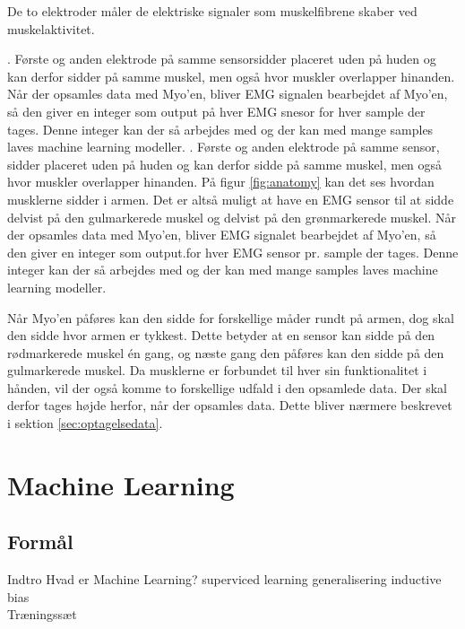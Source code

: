 De to elektroder måler de elektriske signaler som muskelfibrene skaber ved muskelaktivitet.

\cite{nerveledning}. Første og anden elektrode på samme sensorsidder placeret uden på huden og kan derfor sidder på samme muskel, men også hvor muskler overlapper hinanden. Når der opsamles data med Myo'en, bliver EMG signalen bearbejdet af Myo'en, så den giver en integer som output på hver EMG snesor for hver sample der tages. Denne integer kan der så arbejdes med og der kan med mange samples laves machine learning modeller.
\citep{RefWorks:13}. Første og anden elektrode på samme sensor, sidder placeret uden på huden og kan derfor sidde på samme muskel, men også hvor muskler overlapper hinanden. På figur \ref{fig:anatomy} kan det ses hvordan musklerne sidder i armen. Det er altså muligt at have en EMG sensor til at sidde delvist på den gulmarkerede muskel og delvist på den grønmarkerede muskel. Når der opsamles data med Myo'en, bliver EMG signalet bearbejdet af Myo'en, så den giver en integer som output.for hver EMG sensor pr. sample der tages. Denne integer kan der så arbejdes med og der kan med mange samples laves machine learning modeller.

Når Myo'en påføres kan den sidde for forskellige måder rundt på armen, dog skal den sidde hvor armen er tykkest. Dette betyder at en sensor kan sidde på den rødmarkerede muskel én gang, og næste gang den påføres kan den sidde på den gulmarkerede muskel. Da musklerne er forbundet til hver sin funktionalitet i hånden, vil der også komme to forskellige udfald i den opsamlede data. Der skal derfor tages højde herfor, når der opsamles data. Dette bliver nærmere beskrevet i sektion \ref{sec:optagelsedata}.

\section{Machine Learning}
\label{sec:machineLearning}

\subsection{Formål}

Indtro
Hvad er Machine Learning?
superviced learning
generalisering
inductive bias
\\

Træningssæt 

